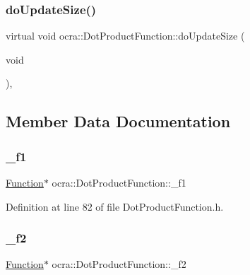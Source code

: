 \hypertarget{classocra_1_1DotProductFunction_af943f9e456e44b3cbe108a964697f239}{}\label{classocra_1_1DotProductFunction_af943f9e456e44b3cbe108a964697f239} 
\subsubsection{\texorpdfstring{do\+Update\+Size()}{doUpdateSize()}}
{\footnotesize\ttfamily virtual void ocra\+::\+Dot\+Product\+Function\+::do\+Update\+Size (\begin{DoxyParamCaption}\item[{void}]{ }\end{DoxyParamCaption})\hspace{0.3cm}{\ttfamily [protected]}, {\ttfamily [virtual]}}



\subsection{Member Data Documentation}
\hypertarget{classocra_1_1DotProductFunction_a3e39a9ce09fc27131afbe8e7a6758681}{}\label{classocra_1_1DotProductFunction_a3e39a9ce09fc27131afbe8e7a6758681} 
\subsubsection{\texorpdfstring{\+\_\+f1}{\_f1}}
{\footnotesize\ttfamily \hyperlink{classocra_1_1Function}{Function}$\ast$ ocra\+::\+Dot\+Product\+Function\+::\+\_\+f1\hspace{0.3cm}{\ttfamily [protected]}}



Definition at line 82 of file Dot\+Product\+Function.\+h.

\hypertarget{classocra_1_1DotProductFunction_a7de350aefad539fdd84453b11019e936}{}\label{classocra_1_1DotProductFunction_a7de350aefad539fdd84453b11019e936} 
\subsubsection{\texorpdfstring{\+\_\+f2}{\_f2}}
{\footnotesize\ttfamily \hyperlink{classocra_1_1Function}{Function}$\ast$ ocra\+::\+Dot\+Product\+Function\+::\+\_\+f2\hspace{0.3cm}{\ttfamily [protected]}}



